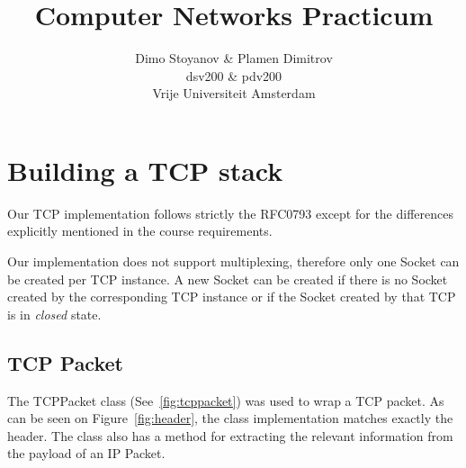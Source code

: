 \documentclass{article}
\title{	\textbf{Computer Networks Practicum}
		}
\author{
		Dimo Stoyanov \& Plamen Dimitrov\\
		dsv200 \& pdv200 \\
		Vrije Universiteit Amsterdam\\	
}
\begin{document}
\maketitle

\section{Building a TCP stack}
Our TCP implementation follows strictly the RFC0793 except for the differences explicitly
mentioned in the course requirements.

Our implementation does not support multiplexing, therefore only one Socket can be created
per TCP instance. A new Socket can be created if there is no Socket created by the corresponding
TCP instance or if the Socket created by that TCP is in \textit{closed} state.

\subsection{TCP Packet}
The TCPPacket class (See~\ref{fig:tcppacket}) was used to wrap a TCP packet. As can be seen
on Figure~\ref{fig:header}, the class implementation matches exactly the header. The class
also has a method for extracting the relevant information from the payload of an IP Packet.
\end{document}
